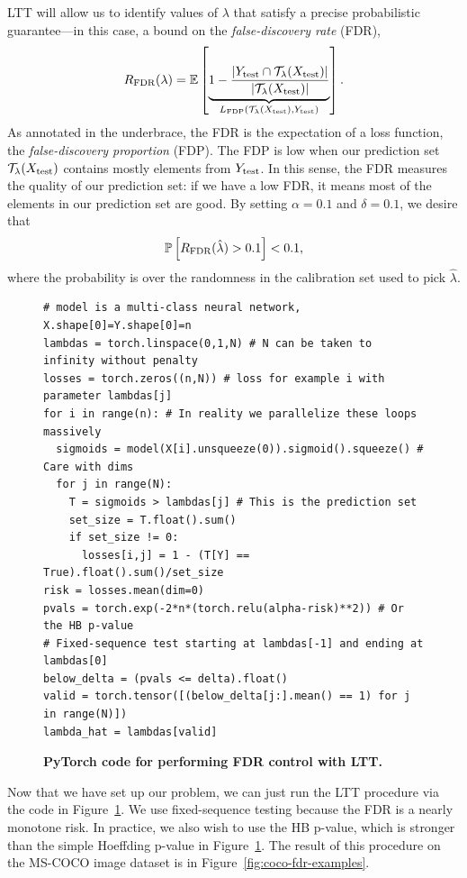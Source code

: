 \documentclass[10pt]{article}
\def\E{\mathbb{E}}
\newcommand{\T}{\mathcal{T}}
\newcommand{\lhat}{\hat{\lambda}}
\renewcommand{\P}{\mathbb{P}}
\begin{document}
LTT will allow us to identify values of $\lambda$ that satisfy a precise probabilistic guarantee---in this case, a bound on the \textit{false-discovery rate} (FDR),
\begin{equation}
    R_{\rm FDR}(\lambda) = \E\left[\underbrace{1 - \frac{\left| Y_{\rm test} \cap \T_{\lambda}(X_{\rm test}) \right|}{\left| \T_{\lambda}(X_{\rm test}) \right|}}_{L_{\rm FDP}(\T_{\lambda}(X_{\rm test}),Y_{\rm test})}\right].
\end{equation}
As annotated in the underbrace, the FDR is the expectation of a loss function, the \emph{false-discovery proportion} (FDP). 
The FDP is low when our prediction set $\T_{\lambda}(X_{\rm test})$ contains mostly elements from $Y_{\rm test}$.
In this sense, the FDR measures the quality of our prediction set: if we have a low FDR, it means most of the elements in our prediction set are good.
By setting $\alpha=0.1$ and $\delta=0.1$, we desire that
\begin{equation}
    \P\left[ R_{\rm FDR}(\lhat) > 0.1 \right] < 0.1,
\end{equation}
where the probability is over the randomness in the calibration set used to pick $\lhat$.

\begin{figure}[h]
    \centering
    \begin{verbatim}
# model is a multi-class neural network, X.shape[0]=Y.shape[0]=n
lambdas = torch.linspace(0,1,N) # N can be taken to infinity without penalty
losses = torch.zeros((n,N)) # loss for example i with parameter lambdas[j]
for i in range(n): # In reality we parallelize these loops massively
  sigmoids = model(X[i].unsqueeze(0)).sigmoid().squeeze() # Care with dims
  for j in range(N):
    T = sigmoids > lambdas[j] # This is the prediction set
    set_size = T.float().sum()
    if set_size != 0:
      losses[i,j] = 1 - (T[Y] == True).float().sum()/set_size
risk = losses.mean(dim=0)
pvals = torch.exp(-2*n*(torch.relu(alpha-risk)**2)) # Or the HB p-value
# Fixed-sequence test starting at lambdas[-1] and ending at lambdas[0]
below_delta = (pvals <= delta).float()
valid = torch.tensor([(below_delta[j:].mean() == 1) for j in range(N)])
lambda_hat = lambdas[valid]
    \end{verbatim}
    \caption{\textbf{PyTorch code for performing FDR control with LTT.}}
    \label{fig:ltt-fdr-code}
\end{figure}

Now that we have set up our problem, we can just run the LTT procedure via the code in Figure~\ref{fig:ltt-fdr-code}.
We use fixed-sequence testing because the FDR is a nearly monotone risk.
In practice, we also wish to use the HB p-value, which is stronger than the simple Hoeffding p-value in Figure~\ref{fig:ltt-fdr-code}.
The result of this procedure on the MS-COCO image dataset is in Figure~\ref{fig:coco-fdr-examples}.
\end{document}
